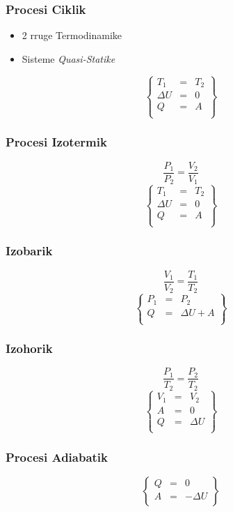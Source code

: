 \documentclass[a4paper, twocolumn]{article}
\begin{document}
\subsubsection{Procesi Ciklik}
\begin{itemize}
	\item 2 rruge Termodinamike
	\item Sisteme \emph{Quasi-Statike}
\end{itemize}
\[
\begin{Bmatrix}
T_{1}&=& T_{2} \\
\Delta U &=& 0 \\
Q &=& A \\
\end{Bmatrix}
\] 
\subsubsection{Procesi Izotermik}
 \[
\frac{P_{1}}{P_{2}} = \frac{V_{2}}{V_{1}}
\] 
\[
\begin{Bmatrix}
T_{1}&=&T_{2} \\
\Delta U &=& 0 \\
Q &= &A \\
\end{Bmatrix}
\]
\subsubsection{Izobarik}
\[
\frac{V_{1}}{V_{2}} = \frac{T_{1}}{T_{2}}
\] 
\[
\begin{Bmatrix}
P_{1}&= &P_{2} \\
Q&=&\Delta U + A\\
\end{Bmatrix}
\]
\subsubsection{Izohorik}
\[
\frac{P_{1}}{T_{2}} = \frac{P_{2}}{T_{2}}
\] 
\[
\begin{Bmatrix}
V_{1}&=& V_{2} \\
A&=&0\\
Q&=&\Delta U\\
\end{Bmatrix}
\]
\subsubsection{Procesi Adiabatik}
\[
\begin{Bmatrix}
Q&=&0\\
A&=&-\Delta U\\
\end{Bmatrix}
\]
\end{document}
